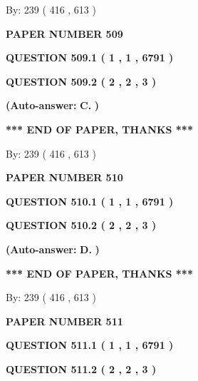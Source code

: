 \documentclass[12pt]{article}
\begin{document}
   
\hspace{1.0in} By: 
 239 ( 416 ,  613 )
   
   
   
   
\newpage 
\setcounter{page}{ 
   509001 } 
   
   
 {\textbf{ \Large{ PAPER NUMBER  509  }}}
   
   
   
   
  
  
{\textbf{\large{QUESTION
509.1 
 ( 1 , 1 , 6791 )
}}}
  
  
{\textbf{\large{QUESTION
509.2 
 ( 2 , 2 , 3 )
}}}
 
 
{\textbf{(Auto-answer:}}
{\textbf{\large{
C.}}}
{\textbf{)}}
 
 
   
   
   
   
\vspace{1.0in} 
{\textbf{\large{ *** END OF PAPER, THANKS *** }}} 
   
   
\hspace{1.0in} By: 
 239 ( 416 ,  613 )
   
   
   
   
\newpage 
\setcounter{page}{ 
   510001 } 
   
   
 {\textbf{ \Large{ PAPER NUMBER  510  }}}
   
   
   
   
  
  
{\textbf{\large{QUESTION
510.1 
 ( 1 , 1 , 6791 )
}}}
  
  
{\textbf{\large{QUESTION
510.2 
 ( 2 , 2 , 3 )
}}}
 
 
{\textbf{(Auto-answer:}}
{\textbf{\large{
D.}}}
{\textbf{)}}
 
 
   
   
   
   
\vspace{1.0in} 
{\textbf{\large{ *** END OF PAPER, THANKS *** }}} 
   
   
\hspace{1.0in} By: 
 239 ( 416 ,  613 )
   
   
   
   
\newpage 
\setcounter{page}{ 
   511001 } 
   
   
 {\textbf{ \Large{ PAPER NUMBER  511  }}}
   
   
   
   
  
  
{\textbf{\large{QUESTION
511.1 
 ( 1 , 1 , 6791 )
}}}
  
  
{\textbf{\large{QUESTION
511.2 
 ( 2 , 2 , 3 )
}}}
 
\end{document}
